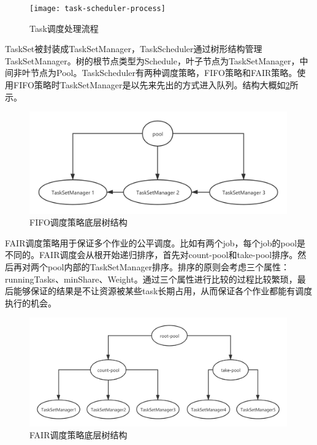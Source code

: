\begin{figure}[htbp]
    \centering
    \texttt{[image: task-scheduler-process]}
    \caption{Task调度处理流程}
    \label{fig:task-scheduler-process}
\end{figure}

TaskSet被封装成TaskSetManager，TaskScheduler通过树形结构管理TaskSetManager。树的根节点类型为Schedule，叶子节点为TaskSetManager，中间非叶节点为Pool。TaskScheduler有两种调度策略，FIFO策略和FAIR策略。使用FIFO策略时TaskSetManager是以先来先出的方式进入队列。结构大概如\ref{fig:scheduler-fifo-tree}所示。

\begin{figure}[htbp]
    \centering
    \includegraphics[width=0.99\textwidth]{Img/FIFIO底层策略.png}
    \caption{FIFO调度策略底层树结构}
    \label{fig:scheduler-fifo-tree}
\end{figure}

FAIR调度策略用于保证多个作业的公平调度。比如有两个job，每个job的pool是不同的。FAIR调度会从根开始递归排序，首先对count-pool和take-pool排序。然后再对两个pool内部的TaskSetManager排序。排序的原则会考虑三个属性：runningTasks、minShare、Weight。通过三个属性进行比较的过程比较繁琐，最后能够保证的结果是不让资源被某些task长期占用，从而保证各个作业都能有调度执行的机会。

\begin{figure}[htbp]
    \centering
    \includegraphics[width=0.99\textwidth]{Img/FAIR底层逻辑.png}
    \caption{FAIR调度策略底层树结构}
    \label{fig:scheduler-fair-tree}
\end{figure}



